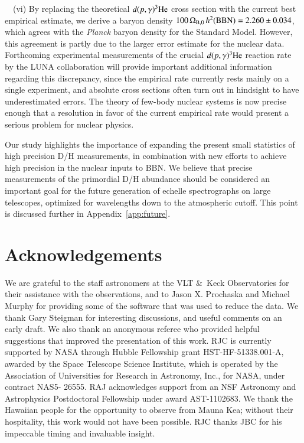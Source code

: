 \documentclass[12pt,preprint,useAMS,usenatbib]{emulateapj}
\begin{document}
\smallskip

\noindent ~~(vi) By replacing the theoretical $d(p,\gamma)^{3}{\rm He}$
cross section with the current best empirical estimate, we derive a baryon
density $100\,\Omega_{\rm B,0}\,h^{2}({\rm BBN}) = 2.260\pm0.034$, which
agrees with the \textit{Planck} baryon density for the Standard Model. However,
this agreement is partly due to the larger error estimate for the nuclear data.
Forthcoming experimental measurements of the crucial $d(p,\gamma)^{3}{\rm He}$
reaction rate by the LUNA collaboration will provide important
additional information regarding this discrepancy, since the empirical rate
currently rests mainly on a single experiment, and absolute cross
sections often turn out in hindsight to have underestimated errors.
The theory of few-body nuclear systems is now precise enough that a
resolution in favor of the current empirical rate would present a
serious problem for nuclear physics.

\smallskip

Our study highlights the importance of expanding the present
small statistics of high precision D/H measurements, in
combination with new efforts to achieve high precision in
the nuclear inputs to BBN. We believe that
precise measurements of the primordial D/H abundance
should be considered an important goal for the future
generation of echelle spectrographs on large telescopes,
optimized for wavelengths down to the atmospheric cutoff.
This point is discussed further in Appendix~\ref{app:future}.

\section*{Acknowledgements}
We are grateful to the staff astronomers at the VLT \&\ Keck  
Observatories for their assistance with the observations, and
to Jason X. Prochaska and Michael Murphy for providing some
of the software that was used to reduce the data. We thank
Gary Steigman for interesting discussions, and useful comments
on an early draft.
We also thank an anonymous referee who provided helpful
suggestions that improved the presentation of this work.
RJC is currently supported by NASA through
Hubble Fellowship grant HST-HF-51338.001-A, awarded by the
Space Telescope Science Institute, which is operated by the
Association of Universities for Research in Astronomy, Inc.,
for NASA, under contract NAS5- 26555. RAJ acknowledges
support from an NSF Astronomy and Astrophysics Postdoctoral
Fellowship under award AST-1102683. We thank the Hawaiian
people for the opportunity to observe from Mauna Kea;
without their hospitality, this work would not have been possible.
RJC thanks JBC for his impeccable timing and invaluable insight.
\end{document}
